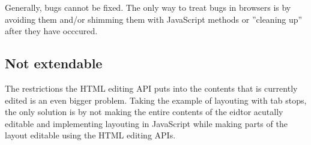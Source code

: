 Generally, bugs cannot be fixed. The only way to treat bugs in browsers is by avoiding them and/or shimming them with JavaScript methods or ''cleaning up'' after they have occcured.

\subsection{Not extendable}
\label{subsec:treating_issues_last}

The restrictions the HTML editing API puts into the contents that is currently edited is an even bigger problem. Taking the example of layouting with tab stops, the only solution is by not making the entire contents of the eidtor acutally editable and implementing layouting in JavaScript while making parts of the layout editable using the HTML editing APIs.



